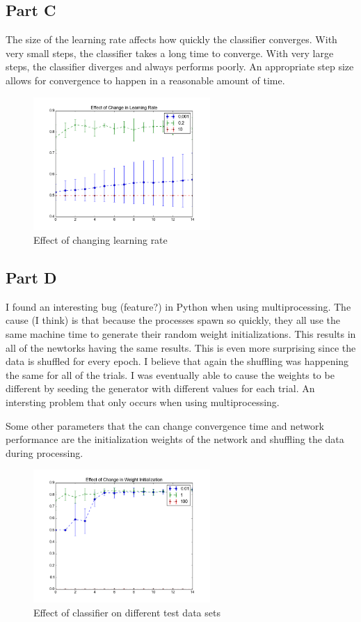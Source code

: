 \subsection{Part C}
The size of the learning rate affects how quickly the classifier converges.  With very small steps, the classifier takes a long time to converge.  With very large steps, the classifier diverges and always performs poorly.  An appropriate step size allows for convergence to happen in a reasonable amount of time.
\begin{figure}[h]
	\centering
	\includegraphics[width=0.6\textwidth]{../train1/learning_rate.png}
	\caption{Effect of changing learning rate}
\end{figure}

\subsection{Part D}
I found an interesting bug (feature?) in Python when using multiprocessing.  The cause (I think) is that because the processes spawn so quickly, they all use the same machine time to generate their random weight initializations.  This results in all of the newtorks having the same results.  This is even more surprising since the data is shuffled for every epoch.  I believe that again the shuffling was happening the same for all of the trials.  I was eventually able to cause the weights to be different by seeding the generator with different values for each trial.  An intersting problem that only occurs when using multiprocessing.

Some other parameters that the can change convergence time and network performance are the initialization weights of the network and shuffling the data during processing.
\begin{figure}[h]
	\centering
	\includegraphics[width=0.6\textwidth]{../train1/weights.png}
	\caption{Effect of classifier on different test data sets}
\end{figure}


